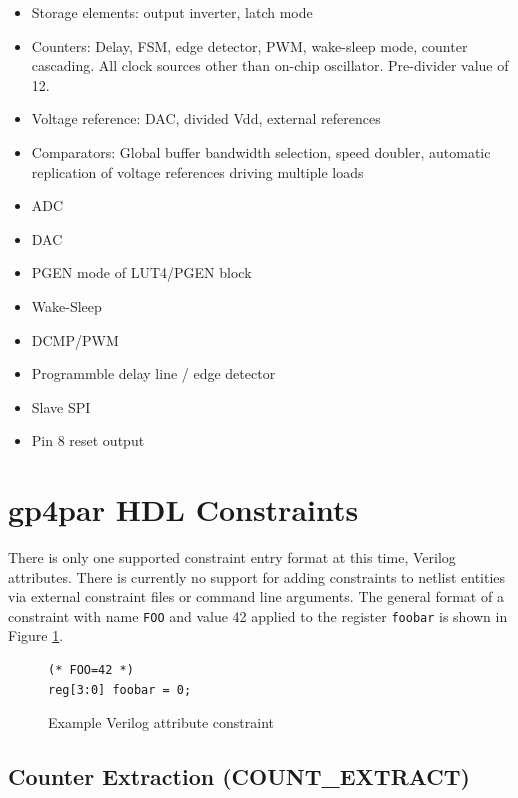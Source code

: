 \documentclass{article}
\begin{document}
\begin{itemize}
\item Storage elements: output inverter, latch mode
\item Counters: Delay, FSM, edge detector, PWM, wake-sleep mode, counter cascading.
All clock sources other than on-chip oscillator. Pre-divider value of 12.
\item Voltage reference: DAC, divided Vdd, external references
\item Comparators: Global buffer bandwidth selection, speed doubler, 
automatic replication of voltage references driving multiple loads
\item ADC
\item DAC
\item PGEN mode of LUT4/PGEN block
\item Wake-Sleep
\item DCMP/PWM
\item Programmble delay line / edge detector
\item Slave SPI
\item Pin 8 reset output
\end{itemize}

\pagebreak
\section{gp4par HDL Constraints}

There is only one supported constraint entry format at this time, Verilog attributes. There is currently no support for 
adding constraints to netlist entities via external constraint files or command line arguments. The general format of a 
constraint with name \texttt{FOO} and value 42 applied to the register \texttt{foobar} is shown in Figure 
\ref{constraint}.

\begin{figure}[h]
\begin{lstlisting}
(* FOO=42 *)
reg[3:0] foobar = 0;
\end{lstlisting}
\caption{Example Verilog attribute constraint}
\label{constraint}
\end{figure}


\pagebreak
\subsection{Counter Extraction (COUNT\_EXTRACT)}
\label{count-extract}
\end{document}
